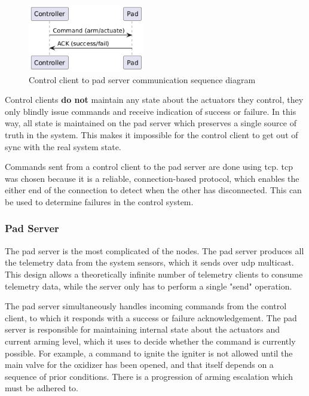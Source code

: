 \begin{figure}[H]
    \center
    \includegraphics[width=2in]{assets/diagrams/control_client_and_pad_sequence.png}
    \caption{Control client to pad server communication sequence diagram}
    \label{fig:cntrl-pad-seq}
\end{figure}

Control clients \textbf{do not} maintain any state about the actuators they control, they only blindly issue commands
and receive indication of success or failure. In this way, all state is maintained on the pad server which preserves a
single source of truth in the system. This makes it impossible for the control client to get out of sync with the real
system state.

Commands sent from a control client to the pad server are done using \gls{tcp}. \Gls{tcp} was chosen because it is a
reliable, connection-based protocol, which enables the either end of the connection to detect when the other has
disconnected. This can be used to determine failures in the control system.

\subsubsection{Pad Server}

The pad server is the most complicated of the nodes. The pad server produces all the telemetry data from the system
sensors, which it sends over \gls{udp} multicast. This design allows a theoretically infinite number of telemetry
clients to consume telemetry data, while the server only has to perform a single "send" operation.

The pad server simultaneously handles incoming commands from the control client, to which it responds with a success or
failure acknowledgement. The pad server is responsible for maintaining internal state about the actuators and current
arming level, which it uses to decide whether the command is currently possible. For example, a command to ignite the
igniter is not allowed until the main valve for the oxidizer has been opened, and that itself depends on a sequence of
prior conditions. There is a progression of arming escalation which must be adhered to.

